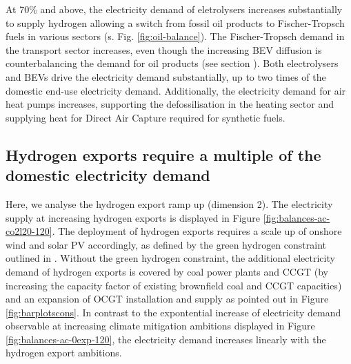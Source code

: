 At 70\% and above, the electricity demand of eletrolysers increases substantially to supply hydrogen allowing a switch from fossil oil products to Fischer-Tropsch fuels in various sectors (s. Fig. \ref{fig:oil-balance}). 
The Fischer-Tropsch demand in the transport sector increases, even though the increasing BEV diffusion is counterbalancing the demand for oil products (see  section ). 
Both electrolysers and BEVs drive the electricity demand substantially, up to two times of the domestic end-use electricity demand. 
Additionally, the electricity demand for air heat pumps increases, supporting the defossilisation in the heating sector and supplying heat for Direct Air Capture required for synthetic fuels.



\subsection*{Hydrogen exports require a multiple of the domestic electricity demand}
\label{subsec:increase_h2}

Here, we analyse the hydrogen export ramp up (dimension 2). The electricity supply at increasing hydrogen exports is displayed in Figure \ref{fig:balances-ac-co2l20-120}. The deployment of hydrogen exports requires a scale up of onshore wind and solar PV accordingly, as defined by the green hydrogen constraint outlined in .
Without the green hydrogen constraint, the additional electricity demand of hydrogen exports is covered by coal power plants and CCGT (by increasing the capacity factor of existing brownfield coal and CCGT capacities) and an expansion of OCGT installation and supply as pointed out in Figure \ref{fig:barplotscons}.
In contrast to the expontential increase of electricity demand observable at increasing climate mitigation ambitions displayed in Figure \ref{fig:balances-ac-0exp-120}, the electricity demand increases linearly with the hydrogen export ambitions.


